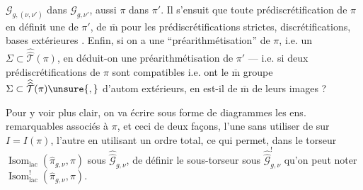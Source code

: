 
 $\mathcal G_{g,(\nu,\nu')}$ dans $\mathcal G_{g,\nu'}$, aussi $\pi$ dans $\pi'$. Il s'ensuit que toute prédiscrétification de $\pi$ en définit une de $\pi'$, de $\overline{\mathrm m}$ pour les prédiscrétifications strictes,  discrétifications, bases extérieures . Enfin, si on a une ``préarithmétisation'' de $\pi$, i.e. un $\Sigma\subset\widehat{\widehat{\mathcal T}}(\pi)$, en déduit-on une préarithmétisation de $\pi'$ --- i.e.  si deux prédiscrétifications de $\pi$ sont compatibles i.e.  ont le $\overline{\mathrm m}$ groupe $\Sigma\subset\widehat{\widehat{\mathcal T}}(\pi)\unsure{,}$ d'autom extérieurs, en est-il de $\overline{\mathrm m}$ de leurs images ?


Pour y voir plus clair, on va écrire sous forme de diagrammes les ens. remarquables associés à $\pi$, et ceci de deux façons, l'une sans utiliser de  sur $I=I(\pi)$, l'autre en utilisant un ordre total, ce qui permet, dans le torseur $\operatorname{Isom}_{\mathrm{lac}}(\widehat\pi_{g,\nu},\pi)$ sous $\widehat{\widehat{\mathcal G}}_{g,\nu}$, de définir le sous-torseur sous $\widehat{\widehat{\mathcal G}}_{g,\nu}^{!}$ qu'on peut noter  $\operatorname{Isom}_{\mathrm{lac}}^{!}(\widehat\pi_{g,\nu},\pi)$.


